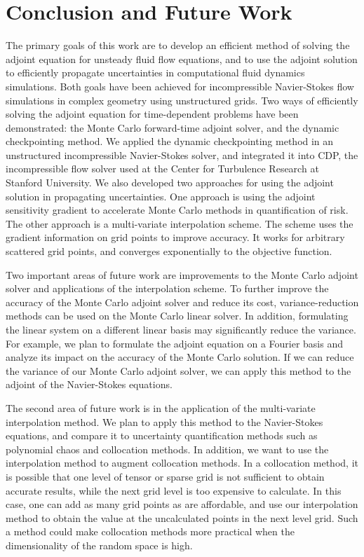 \chapter{Conclusion and Future Work}

The primary goals of this work are to develop an efficient method of solving
the adjoint equation for unsteady fluid flow equations, and to use the adjoint
solution to efficiently propagate uncertainties in computational fluid dynamics
simulations.  Both goals have been achieved for incompressible
Navier-Stokes flow simulations in complex geometry using unstructured grids.
Two ways of efficiently solving the adjoint equation for time-dependent
problems have been demonstrated:
the Monte Carlo forward-time adjoint solver, and
the dynamic checkpointing method.  We applied the dynamic checkpointing
method in an unstructured incompressible Navier-Stokes solver, and integrated
it into CDP, the incompressible flow solver used at the Center for Turbulence
Research at Stanford University.
We also developed two approaches for using the adjoint
solution in propagating uncertainties.  One approach is using the adjoint
sensitivity gradient to accelerate Monte Carlo methods in quantification
of risk.  The other approach is a multi-variate interpolation scheme.
The scheme uses the gradient information on grid points to improve accuracy.
It works for arbitrary scattered grid points, and converges exponentially to
the objective function.

Two important areas of future work are improvements to the Monte Carlo
adjoint solver and applications of the interpolation scheme.
To further improve the accuracy
of the Monte Carlo adjoint solver and reduce its cost, variance-reduction
methods can be used on the Monte Carlo linear solver.  In addition, formulating
the linear system on a different linear basis may significantly reduce the
variance.  For example, we plan to formulate the adjoint equation on a Fourier
basis and analyze its impact on the accuracy of the Monte Carlo solution.
If we can reduce the variance of our Monte Carlo adjoint solver, we can
apply this method to the adjoint of the Navier-Stokes equations.

The second area of future work is in the application of the multi-variate
interpolation method.  We plan to apply this method to the
Navier-Stokes equations,
and compare it to uncertainty quantification methods such as
polynomial chaos and collocation methods.  In addition, we want to use
the interpolation method to augment collocation methods.  In a collocation
method, it is possible that one level of tensor or sparse grid is not
sufficient to obtain accurate results, while the next grid level is too
expensive to calculate.  In this case, one can add as many grid points as
are affordable, and use our interpolation method to obtain the value at the
uncalculated points in the next level grid.  Such a method could
make collocation methods more practical when the dimensionality of the
random space is high.
